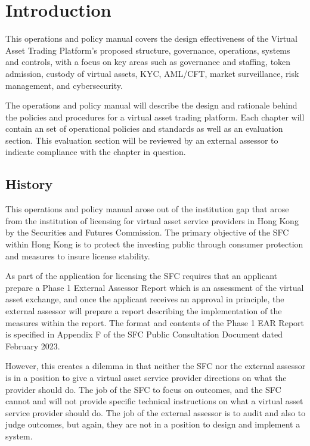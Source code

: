 \chapter{Introduction}

This operations and policy manual covers the design effectiveness of
the Virtual Asset Trading Platform's proposed structure, governance,
operations, systems and controls, with a focus on key areas such as
governance and staffing, token admission, custody of virtual assets,
KYC, AML/CFT, market surveillance, risk management, and cybersecurity.

The operations and policy manual will describe the design and
rationale behind the policies and procedures for a virtual asset
trading platform.  Each chapter will contain an set of operational
policies and standards as well as an evaluation section.  This
evaluation section will be reviewed by an external assessor to
indicate compliance with the chapter in question.

\section{History}

This operations and policy manual arose out of the institution gap
that arose from the institution of licensing for virtual asset service
providers in Hong Kong by the Securities and Futures Commission.  The
primary objective of the SFC within Hong Kong is to protect the
investing public through consumer protection and measures to insure
license stability.

As part of the application for licensing the SFC requires that an
applicant prepare a Phase 1 External Assessor Report which is an
assessment of the virtual asset exchange, and once the applicant
receives an approval in principle, the external assessor will prepare
a report describing the implementation of the measures within the
report.  The format and contents of the Phase 1 EAR Report is
specified in Appendix F of the SFC Public Consultation Document dated
February 2023.

However, this creates a dilemma in that neither the SFC nor the
external assessor is in a position to give a virtual asset service
provider directions on what the provider should do.  The job of the
SFC to focus on outcomes, and the SFC cannot and will not provide
specific technical instructions on what a virtual asset service
provider should do.  The job of the external assessor is to audit and
also to judge outcomes, but again, they are not in a position to
design and implement a system.

